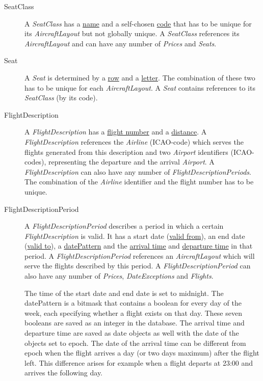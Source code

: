 \documentclass[a4paper,11pt]{article}
\newcommand{\npar}{\par \vspace{2.3ex plus 0.3ex minus 0.3ex} \noindent}
\newcommand{\dsltype}[1]{\textit{#1}}
\newcommand{\dslattr}[1]{\uline{#1}}
\begin{document}
\begin{description}
\item[SeatClass]
A \dsltype{SeatClass} has a \dslattr{name} and a self-chosen \dslattr{code} that has to be unique for its \dsltype{AircraftLayout} but not globally unique. A \dsltype{SeatClass} references its \dsltype{AircraftLayout} and can have any number of \dsltype{Prices} and \dsltype{Seats}.

\item[Seat]
A \dsltype{Seat} is determined by a \dslattr{row} and a \dslattr{letter}. The combination of these two has to be unique for each \dsltype{AircraftLayout}. A \dsltype{Seat} contains references to its \dsltype{SeatClass} (by its code).

\item[FlightDescription]
A \dsltype{FlightDescription} has a \dslattr{flight number} and a \dslattr{distance}. A \dsltype{FlightDescription} references the \dsltype{Airline} (ICAO-code) which serves the flights generated from this description and two \dsltype{Airport} identifiers (ICAO-codes), representing the departure and the arrival \dsltype{Airport}. A \dsltype{FlightDescription} can also have any number of \dsltype{FlightDescriptionPeriods}. The combination of the \dsltype{Airline} identifier and the flight number has to be unique.

\item[FlightDescriptionPeriod]
A \dsltype{FlightDescriptionPeriod} describes a period in which a certain \dsltype{FlightDescription} is valid. It has a start date (\dslattr{valid from}), an end date (\dslattr{valid to}), a \dslattr{datePattern} and the \dslattr{arrival time} and \dslattr{departure time} in that period. A \dsltype{FlightDescriptionPeriod} references an \dsltype{AircraftLayout} which will serve the flights described by this period. A \dsltype{FlightDescriptionPeriod} can also have any number of \dsltype{Prices}, \dsltype{DateExceptions} and \dsltype{Flights}.

\npar The time of the start date and end date is set to midnight. The datePattern is a bitmask that contains a boolean for every day of the week, each specifying whether a flight exists on that day. These seven booleans are saved as an integer in the database. The arrival time and departure time are saved as date objects as well with the date of the objects set to epoch. The date of the arrival time can be different from epoch when the flight arrives a day (or two days maximum) after the flight left. This difference arises for example when a flight departs at 23:00 and arrives the following day.


\end{description}
\end{document}

